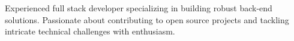 

\begin{cvparagraph}

Experienced full stack developer specializing in building robust back-end solutions. Passionate about contributing to open source projects and tackling intricate technical challenges with enthusiasm.
\end{cvparagraph}
